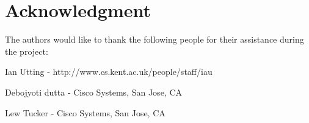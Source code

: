 \documentclass[10pt, a4paper, conference, compsocconf]{IEEEtran}
\begin{document}

















\section*{Acknowledgment}
The authors would like to thank the following people for their assistance during
the project:

Ian Utting - http://www.cs.kent.ac.uk/people/staff/iau

Debojyoti dutta - Cisco Systems, San Jose, CA

Lew Tucker - Cisco Systems, San Jose, CA


\end{document}
